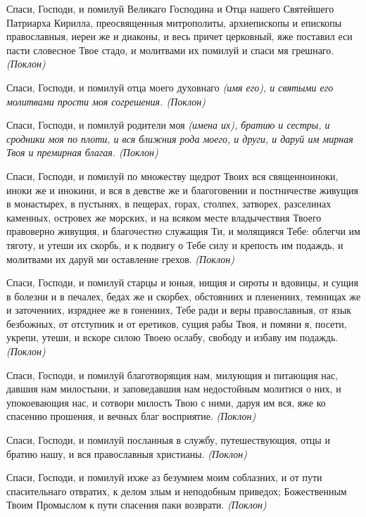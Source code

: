 Спаси, Господи, и помилуй Великаго Господина и Отца нашего Святейшего Патриарха Кирилла, преосвященныя митрополиты, архиепископы и епископы православныя, иереи же и диаконы, и весь причет церковный, яже поставил еси пасти словесное Твое стадо, и молитвами их помилуй и спаси мя грешнаго. \itshape (Поклон)\normalfont{} 

Спаси, Господи, и помилуй отца моего духовнаго \itshape (имя его)\normalfont{}, и святыми его молитвами прости моя согрешения. \itshape (Поклон)\normalfont{} 

Спаси, Господи, и помилуй родители моя \itshape (имена их)\normalfont{}, братию и сестры, и сродники моя по плоти, и вся ближния рода моего, и други, и даруй им мирная Твоя и премирная благая. \itshape (Поклон)\normalfont{} 

Спаси, Господи, и помилуй по множеству щедрот Твоих вся священноиноки, иноки же и инокини, и вся в девстве же и благоговении и постничестве живущия в монастырех, в пустынях, в пещерах, горах, столпех, затворех, разселинах каменных, островех же морских, и на всяком месте владычествия Твоего правоверно живущия, и благочестно служащия Ти, и молящияся Тебе: облегчи им тяготу, и утеши их скорбь, и к подвигу о Тебе силу и крепость им подаждь, и молитвами их даруй ми оставление грехов. \itshape (Поклон)\normalfont{} 

Спаси, Господи, и помилуй старцы и юныя, нищия и сироты и вдовицы, и сущия в болезни и в печалех, бедах же и скорбех, обстояниих и пленениих, темницах же и заточениих, изряднее же в гонениих, Тебе ради и веры православныя, от язык безбожных, от отступник и от еретиков, сущия рабы Твоя, и помяни я, посети, укрепи, утеши, и вскоре силою Твоею ослабу, свободу и избаву им подаждь. \itshape (Поклон) \normalfont{}

Спаси, Господи, и помилуй благотворящия нам, милующия и питающия нас, давшия нам милостыни, и заповедавшия нам недостойным молитися о них, и упокоевающия нас, и сотвори милость Твою с ними, даруя им вся, яже ко спасению прошения, и вечных благ восприятие. \itshape (Поклон)\normalfont{} 

Спаси, Господи, и помилуй посланныя в службу, путешествующия, отцы и братию нашу, и вся православныя христианы. \itshape (Поклон)\normalfont{}

Спаси, Господи, и помилуй ихже аз безумием моим соблазних, и от пути спасительнаго отвратих, к делом злым и неподобным приведох; Божественным Твоим Промыслом к пути спасения паки возврати. \itshape (Поклон) \normalfont{}

